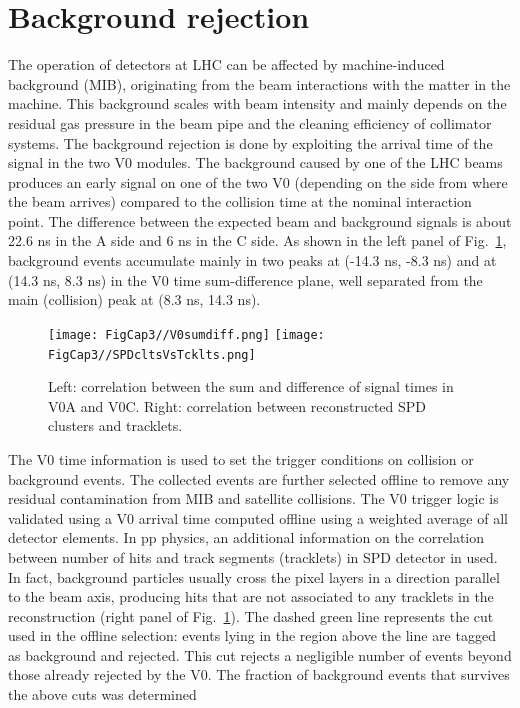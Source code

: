 \section{Background rejection}
\label{sec:BkgRejection}
The operation of detectors at LHC can be affected by machine-induced
background (MIB), originating from the beam interactions with the matter in the machine.
This background scales with beam intensity and mainly depends on the 
residual gas pressure in the beam pipe and the cleaning efficiency of collimator systems.
The background rejection is done by exploiting the arrival time of the signal in the two V0 modules.
The background caused by one of the LHC beams produces an early
signal on one of the two V0 (depending on the side from where the beam arrives) 
compared to the collision time at the nominal interaction point.
The difference between the expected beam and background signals 
is about 22.6 ns in the A side and 6 ns in the C side. As shown in the left panel of Fig.~\ref{fig:V0sumdiff}, 
background events accumulate mainly in two peaks at (-14.3 ns, -8.3 ns)
and at (14.3 ns, 8.3 ns) in the V0 time sum-difference plane, 
well separated from the main (collision) peak at (8.3 ns, 14.3 ns). 
\begin{figure}[!h]
\centering
\texttt{[image: FigCap3//V0sumdiff.png]}
\texttt{[image: FigCap3//SPDcltsVsTcklts.png]}
\caption{Left: correlation between the sum and difference of signal times in 
V0A and V0C. Right: correlation between reconstructed SPD clusters and tracklets. }
\label{fig:V0sumdiff}
\end{figure}
The V0 time information is 
used to set the trigger conditions on collision or background events. 
The collected events are further selected offline to remove any residual
contamination from MIB and satellite collisions.
The V0 trigger logic is validated using a V0 arrival time 
computed offline using a weighted average of all detector elements.
In pp physics, an additional information on the correlation
between number of hits and track segments (tracklets) in SPD detector in used.
In fact, background particles usually cross the pixel layers in a 
direction parallel to the beam axis, producing hits that are not associated 
to any tracklets in the reconstruction (right panel of Fig.~\ref{fig:V0sumdiff}).
The dashed green line represents the cut used in the offline selection: 
events lying in the region above the line are tagged as background and rejected.
This cut rejects a negligible number of events beyond those already rejected by the V0. 
The fraction of background events that survives the above cuts was determined

